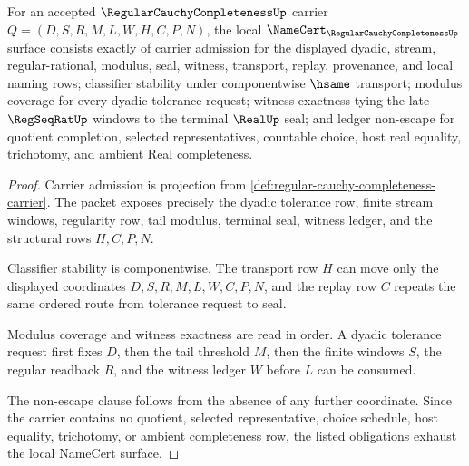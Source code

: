 \begin{theorem}
\label{thm:regular-cauchy-completeness-namecert-obligations}
For an accepted $\RegularCauchyCompletenessUp$ carrier $Q=(D,S,R,M,L,W,H,C,P,N)$, the local $\NameCert_{\RegularCauchyCompletenessUp}$ surface consists exactly of carrier admission for the displayed dyadic, stream, regular-rational, modulus, seal, witness, transport, replay, provenance, and local naming rows; classifier stability under componentwise $\hsame$ transport; modulus coverage for every dyadic tolerance request; witness exactness tying the late $\RegSeqRatUp$ windows to the terminal $\RealUp$ seal; and ledger non-escape for quotient completion, selected representatives, countable choice, host real equality, trichotomy, and ambient Real completeness.
\end{theorem}
\begin{proof}
Carrier admission is projection from \autoref{def:regular-cauchy-completeness-carrier}. The packet exposes precisely the dyadic tolerance row, finite stream windows, regularity row, tail modulus, terminal seal, witness ledger, and the structural rows $H,C,P,N$.

Classifier stability is componentwise. The transport row $H$ can move only the displayed coordinates $D,S,R,M,L,W,C,P,N$, and the replay row $C$ repeats the same ordered route from tolerance request to seal.

Modulus coverage and witness exactness are read in order. A dyadic tolerance request first fixes $D$, then the tail threshold $M$, then the finite windows $S$, the regular readback $R$, and the witness ledger $W$ before $L$ can be consumed.

The non-escape clause follows from the absence of any further coordinate. Since the carrier contains no quotient, selected representative, choice schedule, host equality, trichotomy, or ambient completeness row, the listed obligations exhaust the local NameCert surface.
\end{proof}

